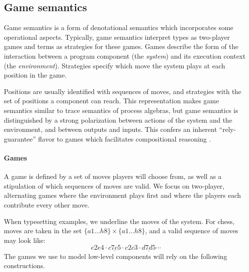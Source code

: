 \documentclass[sigplan,10pt,review]{acmart}
\begin{document}
\subsection{Game semantics} \label{sec:gamesem} %


Game semantics is a form of denotational semantics which
incorporates some operational aspects.
Typically,
game semantics interpret
types as two-player games
and terms as strategies for these games.
Games describe the form of the interaction
between a program component %
(the \emph{system})
and its execution context
(the \emph{environment}).
Strategies
specify which move the system plays
at each position in the game.

Positions are usually identified with sequences of moves,
and strategies with the set of positions
a component can reach.
This representation makes
game semantics similar to
trace semantics of process algebras,
but game semantics is distinguished
by a strong polarization between
actions of the system and the environment,
and between outputs and inputs.
This confers an inherent ``rely-guarantee'' flavor
to games which facilitates compositional reasoning
\cite{cspgs}.


\paragraph{Games} \label{sec:mainideas:gs:games} %

A game is defined by a set of moves
players will choose from,
as well as a stipulation of which
sequences of moves are valid.
We focus on two-player, alternating games
where the environment plays first and
where the players
each contribute every other move.

When typesetting examples,
we underline the moves of the system.
For chess,
moves are taken in the set $\{a1 \ldots h8\} \times \{a1 \ldots h8\}$,
and a valid sequence of moves may look like:
\[ e2e4 \cdot \underline{c7c5} \cdot c2c3 \cdot \underline{d7d5} \cdots \]
The games we use to model low-level components
will rely on the following constructions.
\end{document}
